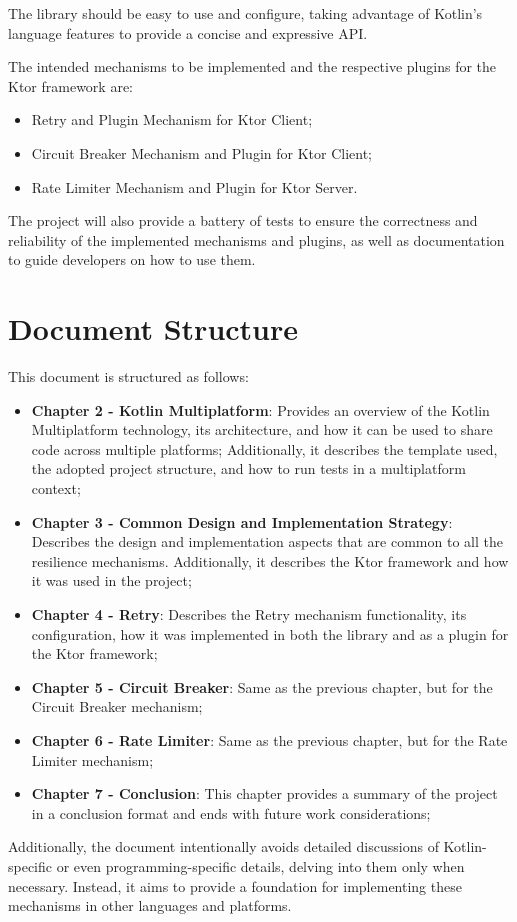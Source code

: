 The library should be easy to use and configure, taking advantage of Kotlin's language features to provide a concise and expressive API.

The intended mechanisms to be implemented and the respective plugins for the Ktor framework are:

\begin{itemize}
    \item Retry and Plugin Mechanism for Ktor Client;
    \item Circuit Breaker Mechanism and Plugin for Ktor Client;
    \item Rate Limiter Mechanism and Plugin for Ktor Server.
\end{itemize}

The project will also provide a battery of tests
to ensure the correctness and reliability of the implemented mechanisms and plugins,
as well as documentation to guide developers on how to use them.


\section{Document Structure}\label{sec:document-structure}

This document is structured as follows:

\begin{itemize}
    \item \textbf{Chapter 2 - Kotlin Multiplatform}: Provides an overview of the Kotlin Multiplatform technology, its architecture, and how it can be used to share code across multiple platforms; Additionally, it describes the template used, the adopted project structure, and how to run tests in a multiplatform context;
    \item \textbf{Chapter 3 - Common Design and Implementation Strategy}: Describes the design and implementation aspects that are common to all the resilience mechanisms.
    Additionally, it describes the Ktor framework and how it was used in the project;
    \item \textbf{Chapter 4 - Retry}: Describes the Retry mechanism functionality, its configuration, how it was implemented in both the library and as a plugin for the Ktor framework;
    \item \textbf{Chapter 5 - Circuit Breaker}: Same as the previous chapter, but for the Circuit Breaker mechanism;
    \item \textbf{Chapter 6 - Rate Limiter}: Same as the previous chapter, but for the Rate Limiter mechanism;
    \item \textbf{Chapter 7 - Conclusion}: This chapter provides a summary of the project in a conclusion format and ends with future work considerations;
\end{itemize}

Additionally, the document intentionally avoids detailed discussions of Kotlin-specific or even programming-specific details,
delving into them only when necessary.
Instead, it aims to provide a foundation for implementing these mechanisms in other languages and platforms.
